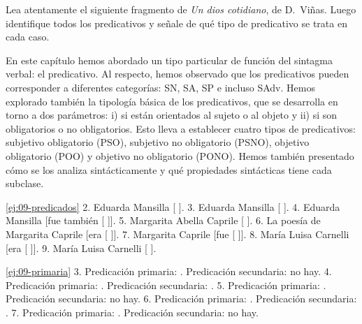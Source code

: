 \begin{ejercicio}\label{ej:09-vinas}
Lea atentamente el siguiente fragmento de \textit{Un dios cotidiano}, de
D.~Viñas. Luego identifique todos los predicativos y señale de qué tipo de
predicativo se trata en cada caso.

\end{ejercicio}

\begin{recuadro}
En este capítulo hemos abordado un tipo particular de función del sintagma
verbal: el predicativo. Al respecto, hemos observado que los predicativos pueden
corresponder a diferentes categorías: SN, SA, SP e incluso SAdv. Hemos
explorado también la tipología básica de los predicativos, que se desarrolla en
torno a dos parámetros: i) si están orientados al sujeto o al objeto y ii) si
son obligatorios o no obligatorios. Esto lleva a establecer cuatro tipos de
predicativos: subjetivo obligatorio (PSO), subjetivo no obligatorio (PSNO),
objetivo obligatorio (POO) y objetivo no obligatorio (PONO). Hemos también
presentado cómo se los analiza sintácticamente y qué propiedades sintácticas
tiene cada subclase.
\end{recuadro}

\lecturasrecomendadas

\solucionario

\begin{solucion}{\ref{ej:09-predicados}}
2. Eduarda Mansilla [ ]. 3. Eduarda
Mansilla [ ]. 4. Eduarda Mansilla [fue
también [ ]]. 5. Margarita Abella Caprile
[ ]. 6. La poesía de Margarita Caprile [era
[ ]]. 7. Margarita Caprile [fue [
]]. 8. María Luisa Carnelli [era [
]]. 9. María Luisa Carnelli [
].
\end{solucion}

\begin{solucion}{\ref{ej:09-primaria}}
3. Predicación primaria: . Predicación secundaria: no
hay. 4. Predicación primaria: . Predicación secundaria:
. 5. Predicación primaria: . Predicación secundaria: no hay. 6. Predicación
primaria: . Predicación secundaria: . 7. Predicación primaria: .
Predicación secundaria: no hay.
\end{solucion}

